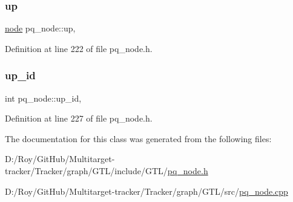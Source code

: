 \subsubsection{\texorpdfstring{up}{up}}
{\footnotesize\ttfamily \mbox{\hyperlink{classnode}{node}} pq\+\_\+node\+::up\hspace{0.3cm}{\ttfamily [protected]}, {\ttfamily [inherited]}}



Definition at line 222 of file pq\+\_\+node.\+h.

\mbox{\label{classpq__node_a5a7bcdde1f57191a77a6a14994b38a50}} 
\subsubsection{\texorpdfstring{up\+\_\+id}{up\_id}}
{\footnotesize\ttfamily int pq\+\_\+node\+::up\+\_\+id\hspace{0.3cm}{\ttfamily [protected]}, {\ttfamily [inherited]}}



Definition at line 227 of file pq\+\_\+node.\+h.



The documentation for this class was generated from the following files\+:\begin{DoxyCompactItemize}
\item 
D\+:/\+Roy/\+Git\+Hub/\+Multitarget-\/tracker/\+Tracker/graph/\+G\+T\+L/include/\+G\+T\+L/\mbox{\hyperlink{pq__node_8h}{pq\+\_\+node.\+h}}\item 
D\+:/\+Roy/\+Git\+Hub/\+Multitarget-\/tracker/\+Tracker/graph/\+G\+T\+L/src/\mbox{\hyperlink{pq__node_8cpp}{pq\+\_\+node.\+cpp}}\end{DoxyCompactItemize}
